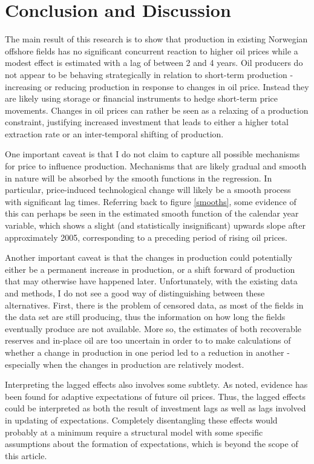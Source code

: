 \documentclass[12pt]{article}
\begin{document}
\section{Conclusion and Discussion}

The main result of this research is to show that production in existing Norwegian offshore fields has no significant concurrent reaction to higher oil prices while a modest effect is estimated  with a lag of between 2 and 4 years.  Oil producers do not appear to be behaving strategically in relation to short-term production - increasing or reducing production in response to changes in oil price.  Instead they are likely using storage or financial instruments to hedge short-term price movements. Changes in oil prices can rather be seen as a relaxing of a production constraint, justifying increased investment that leads to either a higher total extraction rate or an inter-temporal shifting of production.

One important caveat is that I do not claim to capture all possible mechanisms for price to influence production.  Mechanisms that are likely gradual and smooth in nature will be absorbed by the smooth functions in the regression. In particular, price-induced technological change will likely be a smooth process with significant lag times. Referring back to figure \ref{smooths}, some evidence of this can perhaps be seen in the estimated smooth function of the calendar year variable, which shows a slight (and statistically insignificant) upwards slope after approximately 2005, corresponding to a preceding period of rising oil prices.   

Another important caveat is that the changes in production could potentially either be a permanent increase in production, or a shift forward of production that may otherwise have happened later. Unfortunately, with the existing data and methods, I do not see a good way of distinguishing between these alternatives. First, there is the problem of censored data, as most of the fields in the data set are still producing, thus the information on how long the fields eventually produce are not available.  More so, the estimates of both recoverable reserves and in-place oil are too uncertain in order to to make calculations of whether a change in production in one period led to a reduction in another - especially when the changes in production are relatively modest.

Interpreting the lagged effects also involves some subtlety. As noted, evidence has been found for adaptive expectations of future oil prices.  Thus, the lagged effects could be interpreted as both the result of investment lags as well as lags involved in updating of expectations. Completely disentangling these effects would probably at a minimum require a structural model with some specific assumptions about the formation of expectations, which is beyond the scope of this article. 
\end{document}
